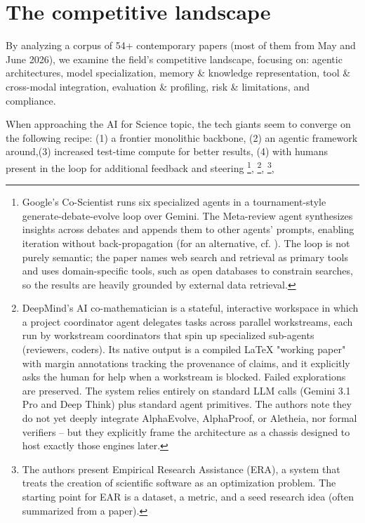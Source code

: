 \section{The competitive landscape}
\label{section:landscape}

\begin{summarybox}
    By analyzing a corpus of 54+ contemporary papers (most of them from May and June 2026), we examine the field's competitive landscape, focusing on: agentic architectures, model specialization, memory \& knowledge representation, tool \& cross-modal integration, evaluation \& profiling, risk \& limitations, and compliance.
\end{summarybox}

When approaching the AI for Science topic, the tech giants seem to converge on the following recipe: (1) a frontier monolithic backbone, (2) an agentic framework around,(3) increased test-time compute for better results, (4) with humans present in the loop for additional feedback and steering
\cite{Gottweis2026}\footnote{%
    Google's Co-Scientist runs six specialized agents in a tournament-style generate-debate-evolve loop over Gemini. The Meta-review agent synthesizes insights across debates and appends them to other agents' prompts, enabling iteration without back-propagation (for an alternative, cf. \cite{Yuksekgonul2025}). The loop is not purely semantic; the paper names web search and retrieval as primary tools and uses domain-specific tools, such as open databases to constrain searches, so the results are heavily grounded by external data retrieval.
},
\cite{2605.06651}\footnote{%
    DeepMind's AI co-mathematician is a stateful, interactive workspace in which a project coordinator agent delegates tasks across parallel workstreams, each run by workstream coordinators that spin up specialized sub-agents (reviewers, coders).
    Its native output is a compiled LaTeX "working paper" with margin annotations tracking the provenance of claims, and it explicitly asks the human for help when a workstream is blocked. Failed explorations are preserved.
    The system relies entirely on standard LLM calls (Gemini 3.1 Pro and Deep Think) plus standard agent primitives. The authors note they do not yet deeply integrate AlphaEvolve, AlphaProof, or Aletheia, nor formal verifiers -- but they explicitly frame the architecture as a chassis designed to host exactly those engines later.
},
\cite{Aygn2026}\footnote{%
    The authors present Empirical Research Assistance (ERA), a system that treats the creation of scientific software as an optimization problem. The starting point for EAR is a dataset, a metric, and a seed research idea (often summarized from a paper).
},

